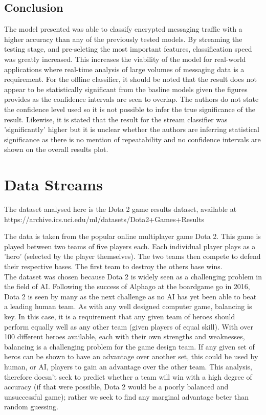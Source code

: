 \documentclass[10pt]{article}
\begin{document}
\subsection{Conclusion}
The model presented was able to classify encrypted messaging traffic with a higher accuracy than any of the previously tested models. By streaming the testing stage, and pre-seleting the most important features, classification speed was greatly increased. This increases the viability of the model for real-world applications where real-time analysis of large volumes of messaging data is a requirement.
For the offline classifier, it should be noted that the result does not appear to be statistically significant from the basline models given the figures provides as the confidence intervals are seen to overlap. The authors do not state the confidence level used so it is not possible to infer the true significance of the result. Likewise,  it is stated that the result for the stream classifier was 'significantly' higher but it is unclear whether the authors are inferring statistical significance as there is no mention of repeatability and no confidence intervals are shown on the overall results plot.




\section {Data Streams}

The dataset analysed here is the Dota 2 game results dataset, available at\\ https://archive.ics.uci.edu/ml/datasets/Dota2+Games+Results

The data is taken from the popular online multiplayer game Dota 2. This game is played between two teams of five players each. Each individual player plays as a 'hero' (selected by the player themselves). The two teams then compete to defend their respective bases. The first team to destroy the others base wins.\\

The dataset was chosen because Dota 2 is widely seen as a challenging problem in the field of AI. Following the success of Alphago at the boardgame go in 2016, Dota 2 is seen by many as the next challenge as no AI has yet been able to beat a leading human team. As with any well designed computer game, balancing is key. In this case, it is a requirement that any given team of heroes should perform equally well as any other team (given players of equal skill). With over 100 different heroes available, each with their own strengths and weaknesses, balancing is a challenging problem for the game design team. If any given set of heros can be shown to have an advantage over another set, this could be used by human, or AI, players to gain an advantage over the other team. This analysis, therefore doesn't seek to predict whether a team will win with a high degree of accuracy (if that were possible, Dota 2 would be a poorly balanced and unsuccessful game); rather we seek to find any marginal advantage beter than random guessing.\\
\end{document}
